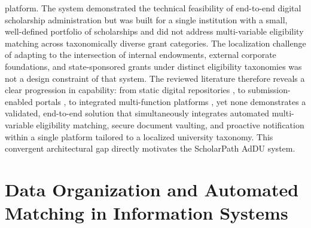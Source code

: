 platform. The system demonstrated the technical feasibility of end-to-end digital scholarship administration but was built for a single institution with a small, well-defined portfolio of scholarships and did not address multi-variable eligibility matching across taxonomically diverse grant categories. The localization challenge of adapting to the intersection of internal endowments, external corporate foundations, and state-sponsored grants under distinct eligibility taxonomies was not a design constraint of that system. The reviewed literature therefore reveals a clear progression in capability: from static digital repositories \cite{ref12}, to submission-enabled portals \cite{ref14,ref3}, to integrated multi-function platforms \cite{ref5}, yet none demonstrates a validated, end-to-end solution that simultaneously integrates automated multi-variable eligibility matching, secure document vaulting, and proactive notification within a single platform tailored to a localized university taxonomy. This convergent architectural gap directly motivates the ScholarPath AdDU system.

\section{Data Organization and Automated Matching in Information Systems}

